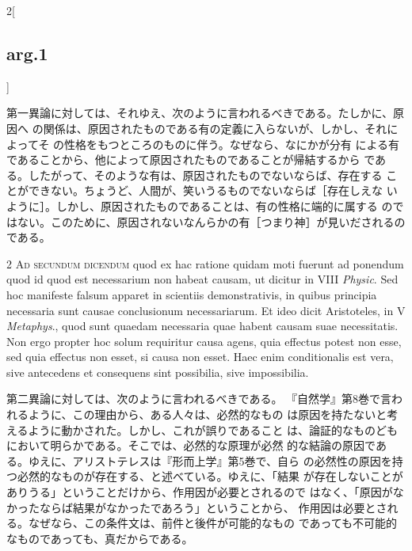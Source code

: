 \documentclass[paper=a4paper,fontsize=10pt,jafontsize=9pt,titlepage]{jlreq}
\begin{document}
\begin{paracol}{2}[\subsection{arg.1}]
\switchcolumn

第一異論に対しては、それゆえ、次のように言われるべきである。たしかに、原因へ
の関係は、原因されたものである有の定義に入らないが、しかし、それによってそ
 の性格をもつところのものに伴う。なぜなら、なにかが分有
による有であることから、他によって原因されたものであることが帰結するから
である。したがって、そのような有は、原因されたものでないならば、存在する
 ことができない。ちょうど、人間が、笑いうるものでないならば［存在しえな
 いように］。しかし、原因されたものであることは、有の性格に端的に属する
 のではない。このために、原因されないなんらかの有［つまり神］が見いだされるのである。

\switchcolumn*[\subsection{ad.2}]

2 {\scshape Ad secundum dicendum} quod ex hac ratione quidam moti fuerunt ad
 ponendum quod id quod est necessarium non habeat causam, ut dicitur in
 VIII {\itshape Physic}. Sed hoc manifeste falsum apparet in scientiis
 demonstrativis, in quibus principia necessaria sunt causae conclusionum
 necessariarum. Et ideo dicit Aristoteles, in V {\itshape Metaphys}., quod sunt
 quaedam necessaria quae habent causam suae necessitatis. Non ergo
 propter hoc solum requiritur causa agens, quia effectus potest non
 esse, sed quia effectus non esset, si causa non esset. Haec enim
 conditionalis est vera, sive antecedens et consequens sint possibilia,
 sive impossibilia.

\switchcolumn

第二異論に対しては、次のように言われるべきである。
『自然学』第8巻で言われるように、この理由から、ある人々は、必然的なもの
 は原因を持たないと考えるように動かされた。しかし、これが誤りであること
 は、論証的なものどもにおいて明らかである。そこでは、必然的な原理が必然
 的な結論の原因である。ゆえに、アリストテレスは『形而上学』第5巻で、自ら
 の必然性の原因を持つ必然的なものが存在する、と述べている。ゆえに、「結果
 が存在しないことがありうる」ということだけから、作用因が必要とされるので
 はなく、「原因がなかったならば結果がなかったであろう」ということから、
 作用因は必要とされる。なぜなら、この条件文は、前件と後件が可能的なもの
 であっても不可能的なものであっても、真だからである。

\switchcolumn*[\subsection{ad.3}]


\end{paracol}
\end{document}
